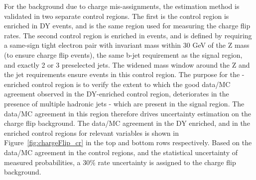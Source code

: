 For the background due to charge mis-assignments, the estimation method is validated in two separate control regions.
The first is the control region is enriched in DY events, and is the same region used for measuring the charge flip rates.
The second control region is enriched in \ttbar events, and is defined by requiring a same-sign tight electron pair with invariant
mass within 30 GeV of the Z mass (to ensure charge flip events), the same b-jet requirement as the signal region,
and exactly 2 or 3 preselected jets. The widened mass window around the Z and the jet requirements ensure \ttbar events in this
control region. The purpose for the \ttbar-enriched control region is to verify the extent to which the good data/MC agreement observed
in the DY-enriched control region, deteriorates in the presence of multiple hadronic jets - which are present in the signal region. 
The data/MC agreement in this region therefore drives uncertainty estimation on the charge flip background. 
The data/MC agreement in the DY enriched, and in the \ttbar enriched control regions
for relevant variables is shown in Figure~\ref{fig:chargeFlip_cr} in the top and bottom rows respectively.
Based on the data/MC agreement in the control regions, and the statistical uncertainty of measured probabilities,
a 30$\%$ rate uncertainty is assigned to the charge flip background.


